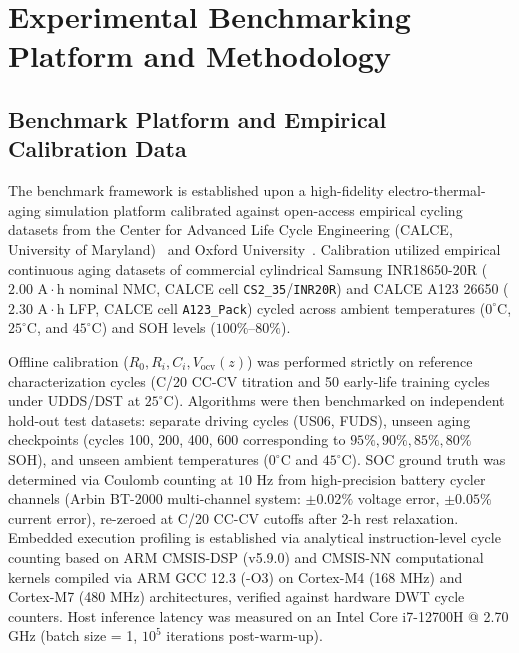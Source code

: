 \documentclass[balance,nocopyright,upint,varvw,hyphenate,barcolor=NavyBlue,nolists]{asmejour}
\begin{document}
\section{Experimental Benchmarking Platform and Methodology}

\subsection{Benchmark Platform and Empirical Calibration Data}
The benchmark framework is established upon a high-fidelity electro-thermal-aging simulation platform calibrated against open-access empirical cycling datasets from the Center for Advanced Life Cycle Engineering (CALCE, University of Maryland)~\cite{Pecht2011calce} and Oxford University~\cite{Birkl2017diagnostics}. Calibration utilized empirical continuous aging datasets of commercial cylindrical Samsung INR18650-20R ($2.00\text{ A}\cdot\text{h}$ nominal NMC, CALCE cell \texttt{CS2\_35}/\allowbreak\texttt{INR20R}) and CALCE A123 26650 ($2.30\text{ A}\cdot\text{h}$ LFP, CALCE cell \texttt{A123\_Pack}) cycled across ambient temperatures ($0^\circ\text{C}$, $25^\circ\text{C}$, and $45^\circ\text{C}$) and SOH levels ($100\%\text{--}80\%$). 

Offline calibration ($R_0, R_i, C_i, V_{\text{ocv}}(z)$) was performed strictly on reference characterization cycles (C/20 CC-CV titration and 50 early-life training cycles under UDDS/DST at $25^\circ\text{C}$). Algorithms were then benchmarked on independent hold-out test datasets: separate driving cycles (US06, FUDS), unseen aging checkpoints (cycles 100, 200, 400, 600 corresponding to $95\%, 90\%, 85\%, 80\%$ SOH), and unseen ambient temperatures ($0^\circ\text{C}$ and $45^\circ\text{C}$). SOC ground truth was determined via Coulomb counting at $10\text{ Hz}$ from high-precision battery cycler channels (Arbin BT-2000 multi-channel system: $\pm 0.02\%$ voltage error, $\pm 0.05\%$ current error), re-zeroed at C/20 CC-CV cutoffs after 2-h rest relaxation. Embedded execution profiling is established via analytical instruction-level cycle counting based on ARM CMSIS-DSP (v5.9.0) and CMSIS-NN computational kernels compiled via ARM GCC 12.3 (-O3) on Cortex-M4 (168 MHz) and Cortex-M7 (480 MHz) architectures, verified against hardware DWT cycle counters. Host inference latency was measured on an Intel Core i7-12700H @ 2.70 GHz (batch size = 1, $10^5$ iterations post-warm-up).
\end{document}
